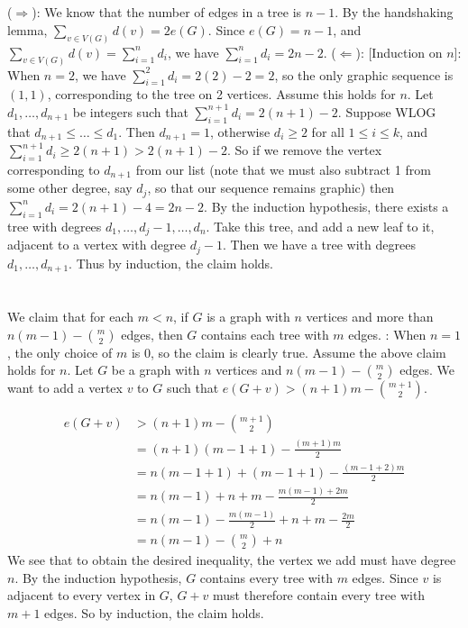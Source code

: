 \documentclass[11pt]{article}
\begin{document}
\renewcommand{\thesubsection}{\thesection.\alph{subsection}}

\section{} %
($\Longrightarrow$): We know that the number of edges in a tree is $n-1$. By
the handshaking lemma, $\sum_{v\in V(G)}d(v)=2e(G)$. Since $e(G)=n-1$, and
$\sum_{v\in V(G)}d(v)=\sum_{i=1}^nd_i$, we have $\sum_{i=1}^nd_i=2n-2$.
\newline
\newline
($\Longleftarrow$): [Induction on $n$]: When $n=2$, we have
$\sum_{i=1}^2d_i=2(2)-2=2$, so the only graphic sequence is $(1,1)$,
corresponding to the tree on 2 vertices. Assume this holds for $n$. Let
$d_1,\ldots,d_{n+1}$ be integers such that $\sum_{i=1}^{n+1}d_i=2(n+1)-2$.
Suppose WLOG that $d_{n+1}\le\ldots\le d_1$. Then $d_{n+1}=1$, otherwise
$d_i\ge2$ for all $1\le i\le k$, and $\sum_{i=1}^{n+1}d_i\ge2(n+1)>2(n+1)-2$.
So if we remove the vertex corresponding to $d_{n+1}$ from our list (note that
we must also subtract 1 from some other degree, say $d_j$, so that our sequence
remains graphic) then $\sum_{i=1}^nd_i=2(n+1)-4=2n-2$. By the induction
hypothesis, there exists a tree with degrees $d_1,\ldots,d_j-1,\ldots,d_n$.
Take this tree, and add a new leaf to it, adjacent to a vertex with degree
$d_j-1$. Then we have a tree with degrees $d_1,\ldots,d_{n+1}$. Thus by
induction, the claim holds.


\section{} %
We claim that for each $m<n$, if $G$ is a graph with $n$ vertices and more than
$n(m-1)-\binom{m}{2}$ edges, then $G$ contains each tree with $m$ edges.
\newline
\newline
[Induction on $n$]: When $n=1$, the only choice of $m$ is 0, so the claim is
clearly true. Assume the above claim holds for $n$. Let $G$ be a graph with $n$
vertices and $n(m-1)-\binom{m}{2}$ edges. We want to add a vertex $v$ to $G$
such that $e(G+v)>(n+1)m-\binom{m+1}{2}$.

\begin{align*}
	e(G+v)&>(n+1)m-\binom{m+1}{2}\\
	&=(n+1)(m-1+1)-\frac{(m+1)m}{2}\\
	&=n(m-1+1)+(m-1+1)-\frac{(m-1+2)m}{2}\\
	&=n(m-1)+n+m-\frac{m(m-1)+2m}{2}\\
	&=n(m-1)-\frac{m(m-1)}{2}+n+m-\frac{2m}{2}\\
	&=n(m-1)-\binom{m}{2}+n
\end{align*}
We see that to obtain the desired inequality, the vertex we add must have
degree $n$. By the induction hypothesis, $G$ contains every tree with $m$ edges.
Since $v$ is adjacent to every vertex in $G$, $G+v$ must therefore contain every
tree with $m+1$ edges. So by induction, the claim holds.
\end{document}
